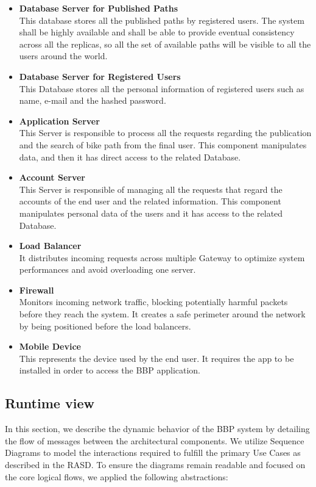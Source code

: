 \begin{itemize}
    \item \textbf{Database Server for Published Paths} \\
    This database stores all the published paths by registered users.
    The system shall be highly available and shall be able to provide eventual consistency across all the
    replicas, so all the set of available paths will be visible to all the users around the world.
    \item \textbf{Database Server for Registered Users} \\
    This Database stores all the personal information of registered users such as name, e-mail and the hashed password.
    \item \textbf{Application Server}\\
    This Server is responsible to process all the requests regarding the publication and the search of bike path from the final user.
    This component manipulates data, and then it has direct access to the related Database.
    \item \textbf{Account Server}\\
    This Server is responsible of managing all the requests that regard the accounts of the end user and the related information.
    This component manipulates personal data of the users and it has access to the related Database.
    \item \textbf{Load Balancer} \\
    It distributes incoming requests across multiple Gateway to optimize system performances and avoid overloading one server.
    \item \textbf{Firewall}\\ %
    Monitors incoming network traffic, blocking potentially harmful packets before they reach the system. It creates
    a safe perimeter around the network by being positioned before the load balancers.
    \item \textbf{Mobile Device} \\
    This represents the device used by the end user. It requires the app to be installed in order to access the BBP application. 
\end{itemize}
\subsection{Runtime view}
In this section, we describe the dynamic behavior of the BBP system by detailing the flow of messages between the architectural components. 
We utilize Sequence Diagrams to model the interactions required to fulfill the primary Use Cases as described in the RASD.
To ensure the diagrams remain readable and focused on the core logical flows, we applied the following abstractions:

